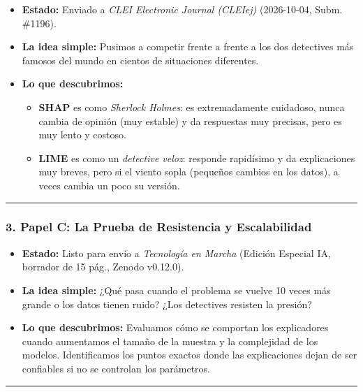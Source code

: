 \documentclass[
]{article}
\providecommand{\tightlist}{%
  \setlength{\itemsep}{0pt}\setlength{\parskip}{0pt}}
\begin{document}
\begin{itemize}
\tightlist
\item
  \textbf{Estado:} Enviado a \emph{CLEI Electronic Journal (CLEIej)}
  (2026-10-04, Subm. \#1196).
\item
  \textbf{La idea simple:} Pusimos a competir frente a frente a los dos
  detectives más famosos del mundo en cientos de situaciones diferentes.
\item
  \textbf{Lo que descubrimos:}

  \begin{itemize}
  \tightlist
  \item
    \textbf{SHAP} es como \emph{Sherlock Holmes}: es extremadamente
    cuidadoso, nunca cambia de opinión (muy estable) y da respuestas muy
    precisas, pero es muy lento y costoso.
  \item
    \textbf{LIME} es como un \emph{detective veloz}: responde rapidísimo
    y da explicaciones muy breves, pero si el viento sopla (pequeños
    cambios en los datos), a veces cambia un poco su versión.
  \end{itemize}
\end{itemize}

\begin{center}\rule{0.5\linewidth}{0.5pt}\end{center}

\subsubsection{3. Papel C: La Prueba de Resistencia y
Escalabilidad}\label{papel-c-la-prueba-de-resistencia-y-escalabilidad}

\begin{itemize}
\tightlist
\item
  \textbf{Estado:} Listo para envío a \emph{Tecnología en Marcha}
  (Edición Especial IA, borrador de 15 pág., Zenodo v0.12.0).
\item
  \textbf{La idea simple:} ¿Qué pasa cuando el problema se vuelve 10
  veces más grande o los datos tienen ruido? ¿Los detectives resisten la
  presión?
\item
  \textbf{Lo que descubrimos:} Evaluamos cómo se comportan los
  explicadores cuando aumentamos el tamaño de la muestra y la
  complejidad de los modelos. Identificamos los puntos exactos donde las
  explicaciones dejan de ser confiables si no se controlan los
  parámetros.
\end{itemize}

\begin{center}\rule{0.5\linewidth}{0.5pt}\end{center}
\end{document}
